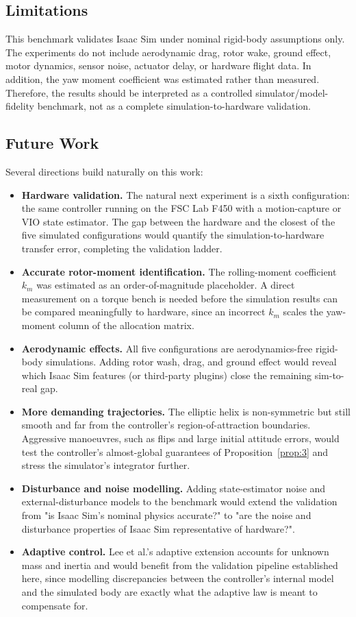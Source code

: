 \documentclass[11pt]{article}
\theoremstyle{remark}
\begin{document}
\subsection{Limitations}
\label{sec:limitations}
This benchmark validates Isaac Sim under nominal rigid-body assumptions only. The experiments do not include aerodynamic drag, rotor wake, ground effect, motor dynamics, sensor noise, actuator delay, or hardware flight data. In addition, the yaw moment coefficient was estimated rather than measured. Therefore, the results should be interpreted as a controlled simulator/model-fidelity benchmark, not as a complete simulation-to-hardware validation.

\subsection{Future Work}
\label{sec:future-work}
Several directions build naturally on this work:
\begin{itemize}
    \item \textbf{Hardware validation.} The natural next experiment is a sixth configuration: the same controller running on the FSC Lab F450 with a motion-capture or VIO state estimator. The gap between the hardware and the closest of the five simulated configurations would quantify the simulation-to-hardware transfer error, completing the validation ladder.
    \item \textbf{Accurate rotor-moment identification.} The rolling-moment coefficient $k_m$ was estimated as an order-of-magnitude placeholder. A direct measurement on a torque bench is needed before the simulation results can be compared meaningfully to hardware, since an incorrect $k_m$ scales the yaw-moment column of the allocation matrix.
    \item \textbf{Aerodynamic effects.} All five configurations are aerodynamics-free rigid-body simulations. Adding rotor wash, drag, and ground effect would reveal which Isaac Sim features (or third-party plugins) close the remaining sim-to-real gap.
    \item \textbf{More demanding trajectories.} The elliptic helix is non-symmetric but still smooth and far from the controller's region-of-attraction boundaries. Aggressive manoeuvres, such as flips and large initial attitude errors, would test the controller's almost-global guarantees of Proposition~\ref{prop:3} and stress the simulator's integrator further.
    \item \textbf{Disturbance and noise modelling.} Adding state-estimator noise and external-disturbance models to the benchmark would extend the validation from "is Isaac Sim's nominal physics accurate?" to "are the noise and disturbance properties of Isaac Sim representative of hardware?".
    \item \textbf{Adaptive control.} Lee et al.'s adaptive extension accounts for unknown mass and inertia and would benefit from the validation pipeline established here, since modelling discrepancies between the controller's internal model and the simulated body are exactly what the adaptive law is meant to compensate for.
\end{itemize}
\end{document}
